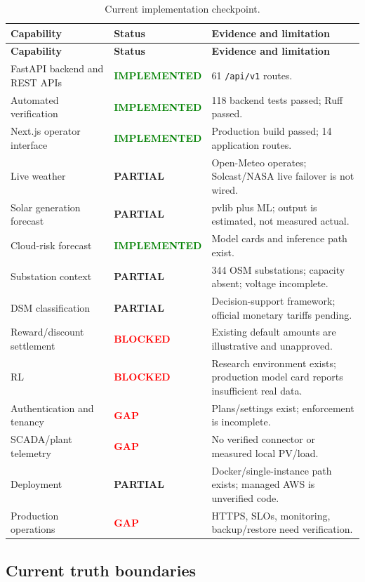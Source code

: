 \documentclass[11pt,a4paper]{article}
\newcommand{\stImpl}{\textcolor{green}{\textbf{IMPLEMENTED}}}
\newcommand{\stPartial}{\textcolor{amber!80!black}{\textbf{PARTIAL}}}
\newcommand{\stGap}{\textcolor{red}{\textbf{GAP}}}
\newcommand{\stBlocked}{\textcolor{red}{\textbf{BLOCKED}}}
\newcommand{\code}[1]{\texttt{\small #1}}
\begin{document}
\begin{footnotesize}
\begin{longtable}{@{}p{3.1cm}p{3.2cm}p{8.2cm}@{}}
\caption{Current implementation checkpoint.}\label{tab:baseline}\\
\toprule
\textbf{Capability} & \textbf{Status} & \textbf{Evidence and limitation}\\
\midrule
\endfirsthead
\toprule
\textbf{Capability} & \textbf{Status} & \textbf{Evidence and limitation}\\
\midrule
\endhead
\bottomrule
\endfoot
FastAPI backend and REST APIs & \stImpl & 61 \code{/api/v1} routes.\\
Automated verification & \stImpl & 118 backend tests passed; Ruff passed.\\
Next.js operator interface & \stImpl & Production build passed; 14 application routes.\\
Live weather & \stPartial & Open-Meteo operates; Solcast/NASA live failover is not wired.\\
Solar generation forecast & \stPartial & pvlib plus ML; output is estimated, not measured actual.\\
Cloud-risk forecast & \stImpl & Model cards and inference path exist.\\
Substation context & \stPartial & 344 OSM substations; capacity absent; voltage incomplete.\\
DSM classification & \stPartial & Decision-support framework; official monetary tariffs pending.\\
Reward/discount settlement & \stBlocked & Existing default amounts are illustrative and unapproved.\\
RL & \stBlocked & Research environment exists; production model card reports insufficient real data.\\
Authentication and tenancy & \stGap & Plans/settings exist; enforcement is incomplete.\\
SCADA/plant telemetry & \stGap & No verified connector or measured local PV/load.\\
Deployment & \stPartial & Docker/single-instance path exists; managed AWS is unverified code.\\
Production operations & \stGap & HTTPS, SLOs, monitoring, backup/restore need verification.\\
\end{longtable}
\end{footnotesize}

\subsection{Current truth boundaries}
\end{document}
